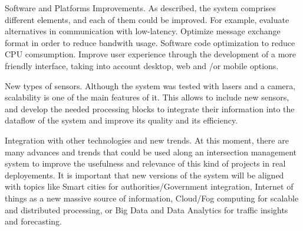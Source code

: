 Software and Platforms Improvements. As described, the system comprises different elements, and each of them could be improved. For example, evaluate alternatives in communication with low-latency. Optimize message exchange format in order to reduce bandwith usage. Software code optimization to reduce CPU comsumption. Improve user experience through the development of a more friendly interface, taking into account desktop, web and /or mobile options.

New types of sensors. Although the system was tested with lasers and a camera, scalability is one of the main features of it. This allows to include new sensors, and develop the needed processing blocks to integrate their information into the dataflow of the system and improve its quality and its efficiency.

Integration with other technologies and new trends. At this moment, there are many advances and trends that could be used along an intersection management system to improve the usefulness and relevance of this kind of projects in real deployements. It is important that new versions of the system will be aligned with topics like Smart cities for authorities/Government integration, Internet of things as a new massive source of information, Cloud/Fog computing for scalable and distributed processing, or Big Data and Data Analytics for traffic insights and forecasting.
